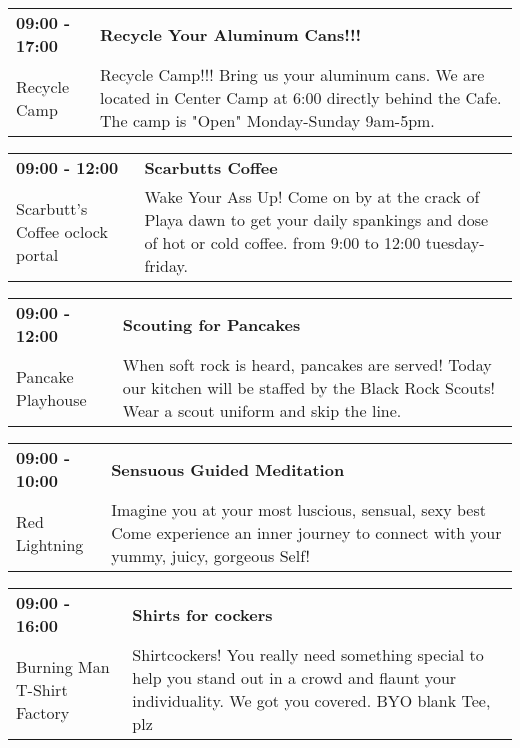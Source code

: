 \begin{tabular}{ p{1in} p{2.2in} }
    \textbf{09:00 - 17:00} & \textbf{Recycle Your Aluminum Cans!!!} \\
    Recycle Camp \newline  & Recycle Camp!!! Bring us your aluminum cans. We are located in Center Camp at 6:00 directly behind the Cafe. The camp is "Open" Monday-Sunday 9am-5pm. \\
    \hline 
\end{tabular}
    
\begin{tabular}{ p{1in} p{2.2in} }
    \textbf{09:00 - 12:00} & \textbf{Scarbutts Coffee} \\
    Scarbutt's Coffee \newline 9 oclock portal & Wake Your Ass Up! Come on by at the crack of Playa dawn to get your daily spankings and dose of hot or cold coffee. from 9:00 to 12:00 tuesday-friday. \\
    \hline 
\end{tabular}
    
\begin{tabular}{ p{1in} p{2.2in} }
    \textbf{09:00 - 12:00} & \textbf{Scouting for Pancakes} \\
    Pancake Playhouse \newline  & When soft rock is heard, pancakes are served!  Today our kitchen will be staffed by the Black Rock Scouts!  Wear a scout uniform and skip the line. \\
    \hline 
\end{tabular}
    
\begin{tabular}{ p{1in} p{2.2in} }
    \textbf{09:00 - 10:00} & \textbf{Sensuous Guided Meditation} \\
    Red Lightning \newline  & Imagine you at your most luscious, sensual, sexy best ~ Come experience an inner journey to connect with your yummy, juicy, gorgeous Self! \\
    \hline 
\end{tabular}
    
\begin{tabular}{ p{1in} p{2.2in} }
    \textbf{09:00 - 16:00} & \textbf{Shirts for cockers} \\
    Burning Man T-Shirt Factory \newline  & Shirtcockers! You really need something special to help you stand out in a crowd and flaunt your individuality. We got you covered. BYO blank Tee, plz \\
    \hline 
\end{tabular}
    

